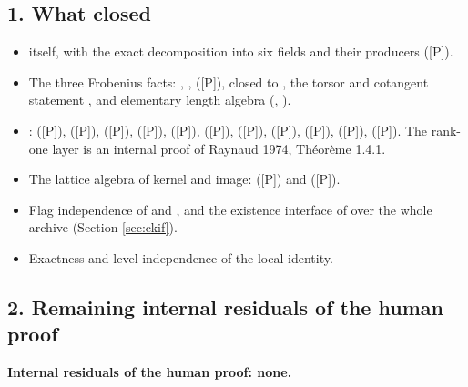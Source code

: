 \documentclass[11pt]{article}
\newcommand{\mP}{\textsf{[P]}}
\theoremstyle{remark}
\begin{document}
\subsection*{1. What closed}
\begin{itemize}[nosep]
\item {} itself, with the exact decomposition into six fields and their producers (\mP).
\item The three Frobenius facts: , ,  (\mP), closed to , the torsor and cotangent statement , and elementary length algebra (, ).
\item {}:  (\mP),  (\mP),  (\mP),  (\mP),  (\mP),  (\mP),  (\mP),  (\mP),  (\mP),  (\mP),  (\mP). The rank-one layer is an internal proof of Raynaud 1974, Th\'eor\`eme 1.4.1.
\item The lattice algebra of kernel and image:  (\mP) and  (\mP).
\item Flag independence of  and , and the existence interface of  over the whole archive (Section \ref{sec:ckif}).
\item Exactness and level independence of the local identity.
\end{itemize}

\clearpage
\subsection*{2. Remaining internal residuals of the human proof}
\textbf{Internal residuals of the human proof: none.}
\end{document}
